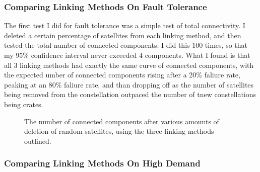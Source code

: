 \documentclass[12pt]{article}
\begin{document}
\subsubsection{Comparing Linking Methods On Fault Tolerance}

The first test I did for fault tolerance was a simple test of total connectivity. I deleted a certain percentage of satellites from each linking method, and then tested the total number of connected components. I did this 100 times, so that my 95\% confidence interval never exceeded 4 components. What I found is that all 3 linking methods had exactly the same curve of connected components, with the expected umber of connected components rising after a 20\% faliure rate, peaking at an 80\% faliure rate, and than dropping off as the number of satellites being removed from the constellation outpaced the number of tnew constellations being crates.

\begin{figure}
\label{fig:Connected Components After Deletions}
\caption{The number of connected components after various amounts of deletion of random satellites, using the three linking methods outlined.}
\end{figure}

\subsubsection{Comparing Linking Methods On High Demand}
\end{document}
